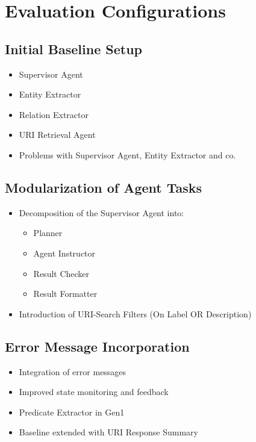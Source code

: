 \documentclass[a4paper,oneside,bibliography=totoc]{scrbook}
\begin{document}
\section{Evaluation Configurations}
\label{sec:evaluation_configurations}
\subsection{Initial Baseline Setup}
\label{subsec:initial_baseline_setup}
\begin{itemize}
  \item Supervisor Agent
  \item Entity Extractor
  \item Relation Extractor
  \item URI Retrieval Agent
  \item Problems with Supervisor Agent, Entity Extractor and co.
\end{itemize}

\subsection{Modularization of Agent Tasks}
\label{subsec:modularization_agent_tasks}
\begin{itemize}
  \item Decomposition of the Supervisor Agent into:
        \begin{itemize}
          \item Planner
          \item Agent Instructor
          \item Result Checker
          \item Result Formatter
        \end{itemize}

  \item Introduction of URI-Search Filters (On Label OR Description)
\end{itemize}

\subsection{Error Message Incorporation}
\label{subsec:error_message_incorporation}
\begin{itemize}
  \item Integration of error messages
  \item Improved state monitoring and feedback
  \item Predicate Extractor in Gen1
  \item Baseline extended with URI Response Summary
\end{itemize}
\end{document}
